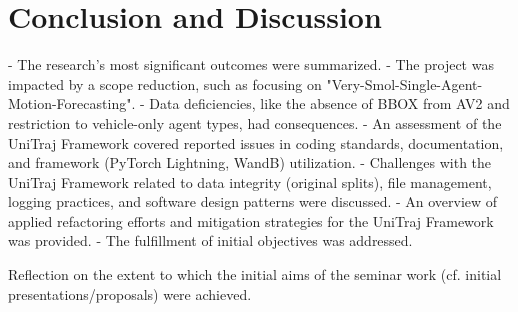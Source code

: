 
\chapter{Conclusion and Discussion}
\label{ch:conclusion_future}
- The research's most significant outcomes were summarized.
- The project was impacted by a scope reduction, such as focusing on "Very-Smol-Single-Agent-Motion-Forecasting".
- Data deficiencies, like the absence of BBOX from AV2 and restriction to vehicle-only agent types, had consequences.
- An assessment of the UniTraj Framework covered reported issues in coding standards, documentation, and framework (PyTorch Lightning, WandB) utilization.
- Challenges with the UniTraj Framework related to data integrity (original splits), file management, logging practices, and software design patterns were discussed.
- An overview of applied refactoring efforts and mitigation strategies for the UniTraj Framework was provided.
- The fulfillment of initial objectives was addressed.


\label{sec:conclusion_objectives}
Reflection on the extent to which the initial aims of the seminar work (cf. initial presentations/proposals) were achieved.

